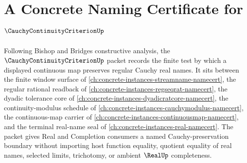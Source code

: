 \chapter{A Concrete Naming Certificate for $\CauchyContinuityCriterionUp$}
\label{ch:concrete-instances-cauchy-continuity-criterion-namecert}

Following Bishop and Bridges constructive analysis, the $\CauchyContinuityCriterionUp$ packet records the finite test by which a displayed continuous map preserves regular Cauchy real names. It sits between the finite window surface of \autoref{ch:concrete-instances-streamname-namecert}, the regular rational readback of \autoref{ch:concrete-instances-regseqrat-namecert}, the dyadic tolerance core of \autoref{ch:concrete-instances-dyadicratcore-namecert}, the continuity-modulus schedule of \autoref{ch:concrete-instances-cauchymodulus-namecert}, the continuous-map carrier of \autoref{ch:concrete-instances-continuousmap-namecert}, and the terminal real-name seal of \autoref{ch:concrete-instances-real-namecert}. The packet gives Real and Completion consumers a named Cauchy-preservation boundary without importing host function equality, quotient equality of real names, selected limits, trichotomy, or ambient $\RealUp$ completeness.

